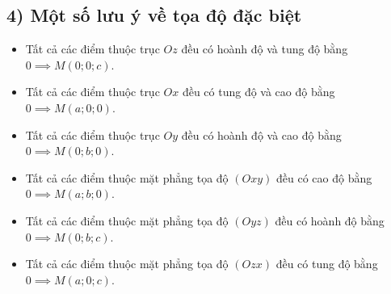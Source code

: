 \documentclass[12pt,a4paper]{extarticle}
\begin{document}
\vspace{1.5em}

\subsection*{4) Một số lưu ý về tọa độ đặc biệt}

\begin{itemize}[leftmargin=*, label=$\bullet$, itemsep=0.4em]
    \item Tất cả các điểm thuộc trục $Oz$ đều có hoành độ và tung độ bằng $0 \implies M(0; 0; c)$.
    \item Tất cả các điểm thuộc trục $Ox$ đều có tung độ và cao độ bằng $0 \implies M(a; 0; 0)$.
    \item Tất cả các điểm thuộc trục $Oy$ đều có hoành độ và cao độ bằng $0 \implies M(0; b; 0)$.
    \item Tất cả các điểm thuộc mặt phẳng tọa độ $(Oxy)$ đều có cao độ bằng $0 \implies M(a; b; 0)$.
    \item Tất cả các điểm thuộc mặt phẳng tọa độ $(Oyz)$ đều có hoành độ bằng $0 \implies M(0; b; c)$.
    \item Tất cả các điểm thuộc mặt phẳng tọa độ $(Ozx)$ đều có tung độ bằng $0 \implies M(a; 0; c)$.
\end{itemize}

\vspace{1.5em}
\end{document}
